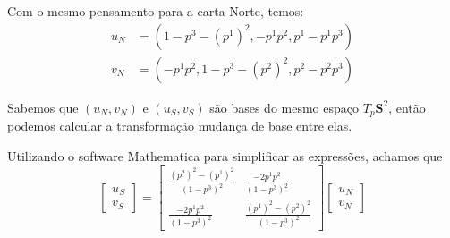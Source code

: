\documentclass[a4paper,12pt,notitlepage]{article}
\renewcommand{\S}{\mathbf{S}}
\begin{document}
	Com o mesmo pensamento para a carta Norte, temos:
	\begin{align}
	u_N&=(1-p^3-(p^1)^2,-p^1p^2,p^1-p^1p^3)\\
	v_N&=(-p^1p^2,1-p^3-(p^2)^2,p^2-p^2p^3)
	\end{align}
	
	Sabemos que $(u_N,v_N)$ e $(u_S,v_S)$ são bases do mesmo espaço $T_p\S^2$, então podemos calcular a transformação mudança de base entre elas.
	
	Utilizando o software Mathematica para simplificar as expressões, achamos que
	\begin{equation}
		\begin{bmatrix}
		u_S\\v_S
		\end{bmatrix}=\begin{bmatrix}
		\frac{(p^2)^2-(p^1)^2}{(1-p^3)^2} & \frac{-2p^1p^2}{(1-p^3)^2}\\
		\frac{-2p^1p^2}{(1-p^3)^2} & \frac{(p^1)^2-(p^2)^2}{(1-p^3)^2}
		\end{bmatrix}\begin{bmatrix}
		u_N\\v_N
		\end{bmatrix}
	\end{equation}
	
\end{document}
